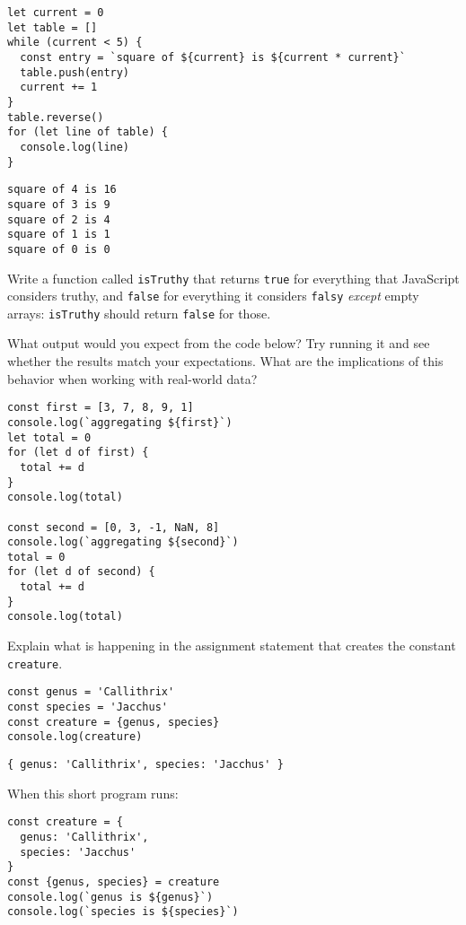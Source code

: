 \begin{verbatim}
let current = 0
let table = []
while (current < 5) {
  const entry = `square of ${current} is ${current * current}`
  table.push(entry)
  current += 1
}
table.reverse()
for (let line of table) {
  console.log(line)
}
\end{verbatim}

\begin{verbatim}
square of 4 is 16
square of 3 is 9
square of 2 is 4
square of 1 is 1
square of 0 is 0
\end{verbatim}


Write a function called \texttt{isTruthy} that returns \texttt{true} for everything that JavaScript considers truthy,
and \texttt{false} for everything it considers \texttt{falsy} \emph{except} empty arrays:
\texttt{isTruthy} should return \texttt{false} for those.


What output would you expect from the code below?
Try running it and see whether the results match your expectations.
What are the implications of this behavior when working with real-world data?

\begin{verbatim}
const first = [3, 7, 8, 9, 1]
console.log(`aggregating ${first}`)
let total = 0
for (let d of first) {
  total += d
}
console.log(total)

const second = [0, 3, -1, NaN, 8]
console.log(`aggregating ${second}`)
total = 0
for (let d of second) {
  total += d
}
console.log(total)
\end{verbatim}


Explain what is happening in the assignment statement that creates the constant \texttt{creature}.

\begin{verbatim}
const genus = 'Callithrix'
const species = 'Jacchus'
const creature = {genus, species}
console.log(creature)
\end{verbatim}

\begin{verbatim}
{ genus: 'Callithrix', species: 'Jacchus' }
\end{verbatim}


When this short program runs:

\begin{verbatim}
const creature = {
  genus: 'Callithrix',
  species: 'Jacchus'
}
const {genus, species} = creature
console.log(`genus is ${genus}`)
console.log(`species is ${species}`)
\end{verbatim}

